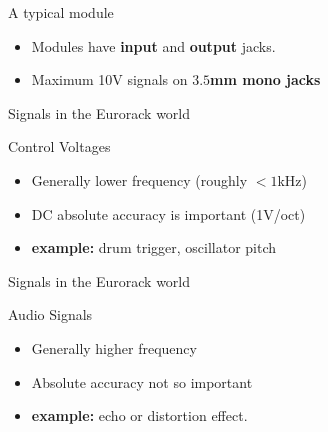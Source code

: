 \documentclass{beamer}
\begin{document}
\begin{frame}{A typical module}

    \begin{itemize}
        \item Modules have \textbf{input} and \textbf{output} jacks.
        \item Maximum 10V signals on \textbf{$3.5$mm mono jacks}
    \end{itemize}


\end{frame}

\begin{frame}{Signals in the Eurorack world}

    \begin{block}{Control Voltages}
        \begin{itemize}
            \item Generally lower frequency (roughly $<1$kHz)
            \item DC absolute accuracy is important (1V/oct)
            \item \textbf{example:} drum trigger, oscillator pitch
        \end{itemize}
    \end{block}


\end{frame}

\begin{frame}{Signals in the Eurorack world}

    \begin{block}{Audio Signals}
        \begin{itemize}
            \item Generally higher frequency
            \item Absolute accuracy not so important
            \item \textbf{example:} echo or distortion effect.
        \end{itemize}
    \end{block}


\end{frame}

\end{document}
